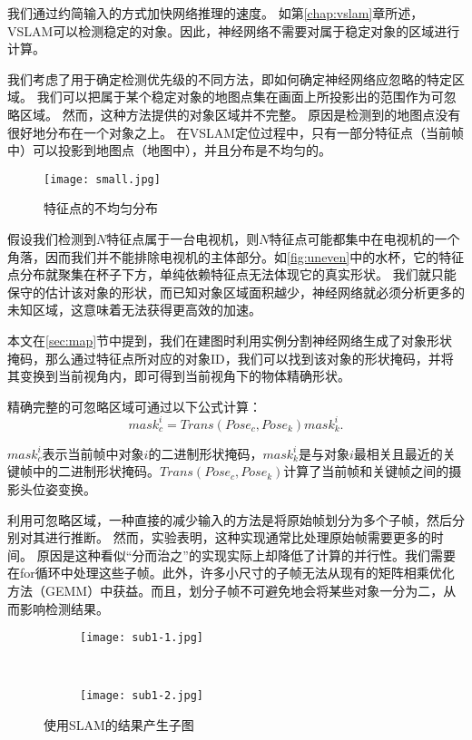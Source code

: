 我们通过约简输入的方式加快网络推理的速度。
如第\ref{chap:vslam}章所述，VSLAM可以检测稳定的对象。因此，神经网络不需要对属于稳定对象的区域进行计算。

我们考虑了用于确定检测优先级的不同方法，即如何确定神经网络应忽略的特定区域。
我们可以把属于某个稳定对象的地图点集在画面上所投影出的范围作为可忽略区域。
然而，这种方法提供的对象区域并不完整。
原因是检测到的地图点没有很好地分布在一个对象之上。
在VSLAM定位过程中，只有一部分特征点（当前帧中）可以投影到地图点（地图中），并且分布是不均匀的。

\begin{figure}[htbp]
	\centering
	\texttt{[image: small.jpg]}
	\caption{特征点的不均匀分布}
	\label{fig:uneven}
\end{figure}

假设我们检测到$N$特征点属于一台电视机，则$N$特征点可能都集中在电视机的一个角落，因而我们并不能排除电视机的主体部分。如\autoref{fig:uneven}中的水杯，它的特征点分布就聚集在杯子下方，单纯依赖特征点无法体现它的真实形状。
我们就只能保守的估计该对象的形状，而已知对象区域面积越少，神经网络就必须分析更多的未知区域，这意味着无法获得更高效的加速。

本文在\ref{sec:map}节中提到，我们在建图时利用实例分割神经网络生成了对象形状掩码，那么通过特征点所对应的对象ID，我们可以找到该对象的形状掩码，并将其变换到当前视角内，即可得到当前视角下的物体精确形状。

精确完整的可忽略区域可通过以下公式计算：
\begin{equation}\label{equ:mask}
mask_c^i = Trans(Pose_c,Pose_k)mask_k^i.
\end{equation} 

$mask_c^i$表示当前帧中对象$i$的二进制形状掩码，$mask_k^i$是与对象$i$最相关且最近的关键帧中的二进制形状掩码。$Trans(Pose_c, Pose_k)$计算了当前帧和关键帧之间的摄影头位姿变换。

利用可忽略区域，一种直接的减少输入的方法是将原始帧划分为多个子帧，然后分别对其进行推断。
然而，实验表明，这种实现通常比处理原始帧需要更多的时间。
原因是这种看似“分而治之”的实现实际上却降低了计算的并行性。我们需要在for循环中处理这些子帧。此外，许多小尺寸的子帧无法从现有的矩阵相乘优化方法（GEMM）中获益。而且，划分子帧不可避免地会将某些对象一分为二，从而影响检测结果。

\begin{figure}[htbp]
	\centering
	\begin{subfigure}{.45\linewidth}
		\texttt{[image: sub1-1.jpg]}
		\caption{}
	\end{subfigure}
	\ 
	\ 
	\ 
	\begin{subfigure}{.45\linewidth}
		\texttt{[image: sub1-2.jpg]}
		\caption{}
	\end{subfigure}
	\caption{使用SLAM的结果产生子图}\label{fig:NN for subgraph}
\end{figure}

